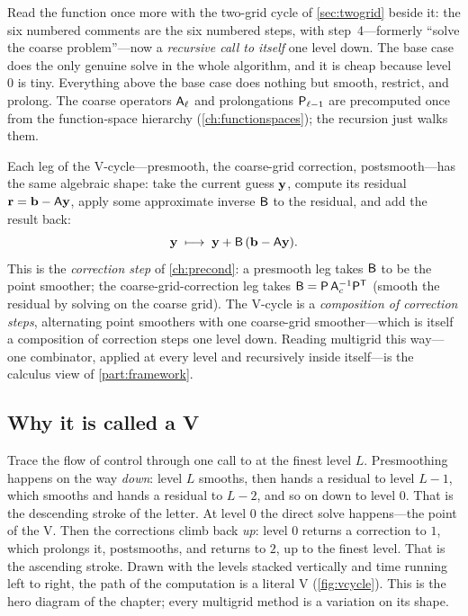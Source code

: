 Read the function once more with the two-grid cycle of \cref{sec:twogrid} beside it: the
six numbered comments are the six numbered steps, with step~4---formerly ``solve the coarse
problem''---now a \emph{recursive call to  itself} one level down. The base
case  does the only genuine solve in the whole algorithm, and it is
cheap because level $0$ is tiny. Everything above the base case does nothing but smooth,
restrict, and prolong. The coarse operators $\mathsf{A}_\ell$ and prolongations
$\mathsf{P}_{\ell-1}$ are precomputed once from the function-space hierarchy
(\cref{ch:functionspaces}); the recursion just walks them.

\begin{notationbox}
Each leg of the V-cycle---presmooth, the coarse-grid correction, postsmooth---has the same
algebraic shape: take the current guess $\mathbf{y}$, compute its residual $\mathbf{r}=\mathbf{b}-\mathsf{A}\mathbf{y}$,
apply some approximate inverse $\mathsf{B}$ to the residual, and add the result back:
\[
  \mathbf{y} \;\longmapsto\; \mathbf{y} + \mathsf{B}\,(\mathbf{b} - \mathsf{A}\mathbf{y}).
\]
This is the \emph{correction step} of \cref{ch:precond}: a presmooth leg takes $\mathsf{B}$ to
be the point smoother; the coarse-grid-correction leg takes $\mathsf{B} =
\mathsf{P}\,\mathsf{A}_c^{-1}\mathsf{P}^{\mathsf T}$ (smooth the residual by solving on the coarse
grid). The V-cycle is a \emph{composition of correction steps}, alternating point smoothers
with one coarse-grid smoother---which is itself a composition of correction steps one level
down. Reading multigrid this way---one combinator, applied at every level and recursively
inside itself---is the calculus view of \cref{part:framework}.
\end{notationbox}

\subsection{Why it is called a V}

Trace the flow of control through one call to  at the finest level $L$.
Presmoothing happens on the way \emph{down}: level $L$ smooths, then hands a residual to
level $L-1$, which smooths and hands a residual to $L-2$, and so on down to level $0$.
That is the descending stroke of the letter. At level $0$ the direct solve happens---the
point of the V. Then the corrections climb back \emph{up}: level $0$ returns a correction to
$1$, which prolongs it, postsmooths, and returns to $2$, up to the finest level. That is the
ascending stroke. Drawn with the levels stacked vertically and time running left to right,
the path of the computation is a literal V (\cref{fig:vcycle}). This is the hero diagram of
the chapter; every multigrid method is a variation on its shape.

